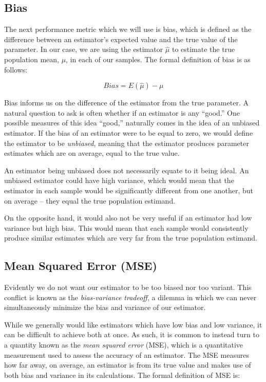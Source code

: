 \documentclass[12pt, twoside]{amherstthesis}
\begin{document}
\hypertarget{bias}{%
\subsection{Bias}\label{bias}}

The next performance metric which we will use is bias, which is defined as the difference between an estimator's expected value and the true value of the parameter. In our case, we are using the estimator \(\hat{\mu}\) to estimate the true population mean, \(\mu\), in each of our samples. The formal definition of bias is as follows:

\[Bias = E(\hat{\mu}) - \mu\]

Bias informs us on the difference of the estimator from the true parameter. A natural question to ask is often whether if an estimator is any ``good.'' One possible measures of this idea ``good,'' naturally comes in the idea of an unbiased estimator. If the bias of an estimator were to be equal to zero, we would define the estimator to be \emph{unbiased}, meaning that the estimator produces parameter estimates which are on average, equal to the true value.

An estimator being unbiased does not necessarily equate to it being ideal. An unbiased estimator could have high variance, which would mean that the estimator in each sample would be significantly different from one another, but on average -- they equal the true population estimand.

On the opposite hand, it would also not be very useful if an estimator had low variance but high bias. This would mean that each sample would consistently produce similar estimates which are very far from the true population estimand.

\hypertarget{mean-squared-error-mse}{%
\subsection{Mean Squared Error (MSE)}\label{mean-squared-error-mse}}

Evidently we do not want our estimator to be too biased nor too variant. This conflict is known as the \emph{bias-variance tradeoff}, a dilemma in which we can never simultaneously minimize the bias and variance of our estimator.

While we generally would like estimators which have low bias and low variance, it can be difficult to achieve both at once. As such, it is common to instead turn to a quantity known as the \emph{mean squared error} (MSE), which is a quantitative measurement used to assess the accuracy of an estimator. The MSE measures how far away, on average, an estimator is from its true value and makes use of both bias and variance in its calculations. The formal definition of MSE is:
\end{document}
